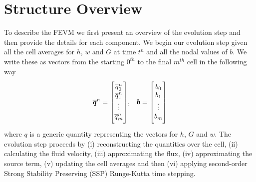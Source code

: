 \section{Structure Overview}
\label{sec:StructOverview}
To describe the FEVM we first present an overview of the evolution step and then provide the details for each component. We begin our evolution step given all the cell averages for $h$, $w$ and $G$ at time $t^n$ and all the nodal values of $b$. We write these as vectors from the starting $0^{th}$ to the final $m^{th}$ cell in the following way
\begin{align*} \overline{\vecn{q}}^n = \begin{bmatrix} \TM
\overline{q}_0^n \\\overline{q}_1^n \\ \vdots \\ \overline{q}_m^n \BM\end{bmatrix} & , & \vecn{b} = \begin{bmatrix} \TM
b_{0} \\ b_{1} \\ \vdots \\b_{m} \BM
\end{bmatrix} \\
\end{align*}
where $q$ is a generic quantity representing the vectors for $h$, $G$ and $w$. The evolution step proceeds by (i) reconstructing the quantities over the cell, (ii) calculating the fluid velocity, (iii) approximating the flux, (iv) approximating the source term, (v) updating the cell averages and then (vi) applying second-order Strong Stability Preserving (SSP) Runge-Kutta time stepping.

